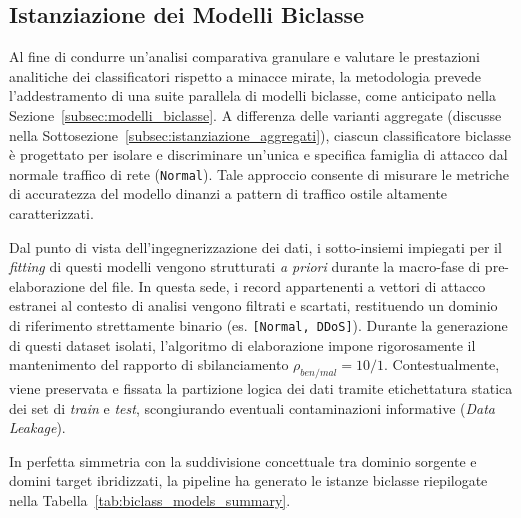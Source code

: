\subsection{Istanziazione dei Modelli Biclasse}
\label{subsec:istanziazione_biclasse}

Al fine di condurre un'analisi comparativa granulare e valutare le prestazioni analitiche dei classificatori rispetto a minacce mirate, la metodologia prevede l'addestramento di una suite parallela di modelli biclasse, come anticipato nella Sezione~\ref{subsec:modelli_biclasse}. 
A differenza delle varianti aggregate (discusse nella Sottosezione~\ref{subsec:istanziazione_aggregati}), ciascun classificatore biclasse è progettato per isolare e discriminare un'unica e specifica famiglia di attacco dal normale traffico di rete (\texttt{Normal}). 
Tale approccio consente di misurare le metriche di accuratezza del modello dinanzi a pattern di traffico ostile altamente caratterizzati.

Dal punto di vista dell'ingegnerizzazione dei dati, i sotto-insiemi impiegati per il \textit{fitting} di questi modelli vengono strutturati \textit{a priori} durante la macro-fase di pre-elaborazione del file. 
In questa sede, i record appartenenti a vettori di attacco estranei al contesto di analisi vengono filtrati e scartati, restituendo un dominio di riferimento strettamente binario (es. \texttt{[Normal, DDoS]}). 
Durante la generazione di questi dataset isolati, l'algoritmo di elaborazione impone rigorosamente il mantenimento del rapporto di sbilanciamento $\rho_{ben/mal} = 10/1$. 
Contestualmente, viene preservata e fissata la partizione logica dei dati tramite etichettatura statica dei set di \textit{train} e \textit{test}, scongiurando eventuali contaminazioni informative (\textit{Data Leakage}).

In perfetta simmetria con la suddivisione concettuale tra dominio sorgente e domini target ibridizzati, la pipeline ha generato le istanze biclasse riepilogate nella Tabella~\ref{tab:biclass_models_summary}.

